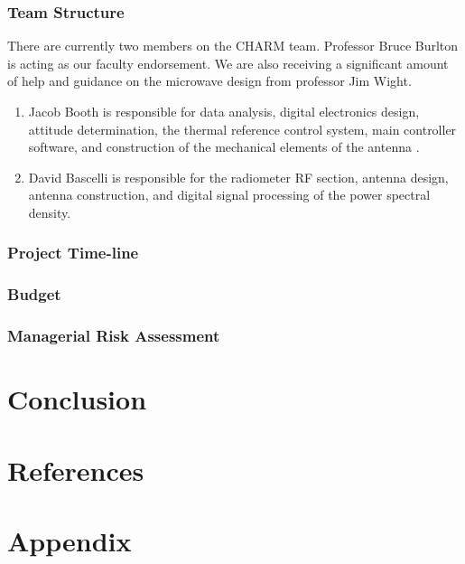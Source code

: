 \documentclass[12pt]{article}
\begin{document}
\subsubsection{Team Structure}
There are currently two members on the CHARM team. Professor Bruce Burlton is acting as our faculty endorsement. We are also receiving a significant amount of help and guidance on the microwave design from professor Jim Wight.

\begin{enumerate}
\item Jacob Booth is responsible for data analysis, digital electronics design, attitude determination, the thermal reference control system, main controller software, and construction of the mechanical elements of the antenna .

\item David Bascelli is responsible for the radiometer RF section, antenna design, antenna construction, and digital signal processing of the power spectral density.

\end{enumerate}
\subsubsection{Project Time-line}
\subsubsection{Budget}
\subsubsection{Managerial Risk Assessment}


\section{Conclusion}

\newpage
\section{References}



\section{Appendix}
\end{document}
